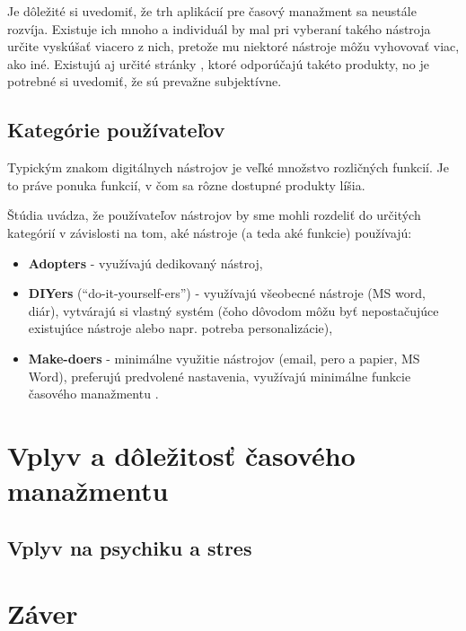 \documentclass[10pt,slovak,a4paper]{article}
\begin{document}
		Je dôležité si uvedomiť, že trh aplikácií pre časový manažment sa neustále rozvíja. Existuje ich mnoho a individuál by mal pri vyberaní takého nástroja určite vyskúšať viacero z nich, pretože mu niektoré nástroje môžu vyhovovať viac, ako iné. Existujú aj určité stránky \cite{JustinPot9best}, ktoré odporúčajú takéto produkty, no je potrebné si uvedomiť, že sú prevažne subjektívne.
		
	\subsection{Kategórie používateľov}
		
		Typickým znakom digitálnych nástrojov je veľké množstvo rozličných funkcií. Je to práve ponuka funkcií, v čom sa rôzne dostupné produkty líšia.
	
		Štúdia \cite{Haraty} uvádza, že používateľov nástrojov by sme mohli rozdeliť do určitých kategórií v závislosti na tom, aké nástroje (a teda aké funkcie) používajú:
		
		\begin{itemize}
			\item \textbf{Adopters} - využívajú dedikovaný nástroj,
			\item \textbf{DIYers} (\enquote{do-it-yourself-ers}) - využívajú všeobecné nástroje (MS word, diár), vytvárajú si vlastný systém (čoho dôvodom môžu byť nepostačujúce existujúce nástroje alebo napr. potreba personalizácie),
			\item \textbf{Make-doers} - minimálne využitie nástrojov (email, pero a papier, MS Word), preferujú predvolené nastavenia, využívajú minimálne funkcie časového manažmentu \cite{Haraty}.
		\end{itemize}

\section{Vplyv a dôležitosť časového manažmentu}
% 
	\subsection{Vplyv na psychiku a stres}
\section{Záver}



\end{document}
